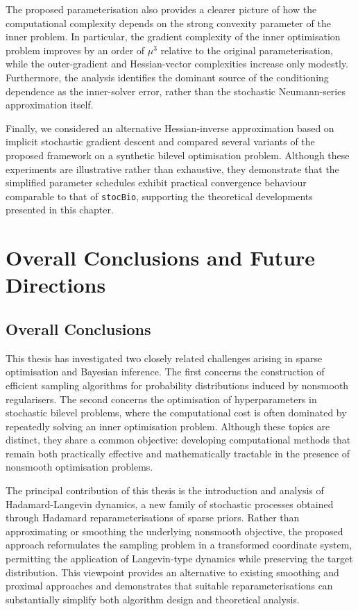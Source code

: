 \documentclass[11pt, twoside]{report}
\begin{document}
The proposed parameterisation also provides a clearer picture of how the computational complexity depends on the strong convexity parameter of the inner problem. In particular, the gradient complexity of the inner optimisation problem improves by an order of $\mu^3$ relative to the original parameterisation, while the outer-gradient and Hessian-vector complexities increase only modestly. Furthermore, the analysis identifies the dominant source of the conditioning dependence as the inner-solver error, rather than the stochastic Neumann-series approximation itself.

Finally, we considered an alternative Hessian-inverse approximation based on implicit stochastic gradient descent and compared several variants of the proposed framework on a synthetic bilevel optimisation problem. Although these experiments are illustrative rather than exhaustive, they demonstrate that the simplified parameter schedules exhibit practical convergence behaviour comparable to that of \texttt{stocBio}, supporting the theoretical developments presented in this chapter.

\chapter{Overall Conclusions and Future Directions}

\section{Overall Conclusions}

This thesis has investigated two closely related challenges arising in sparse optimisation and Bayesian inference. The first concerns the construction of efficient sampling algorithms for probability distributions induced by nonsmooth regularisers. The second concerns the optimisation of hyperparameters in stochastic bilevel problems, where the computational cost is often dominated by repeatedly solving an inner optimisation problem. Although these topics are distinct, they share a common objective: developing computational methods that remain both practically effective and mathematically tractable in the presence of nonsmooth optimisation problems.

The principal contribution of this thesis is the introduction and analysis of Hadamard-Langevin dynamics, a new family of stochastic processes obtained through Hadamard reparameterisations of sparse priors. Rather than approximating or smoothing the underlying nonsmooth objective, the proposed approach reformulates the sampling problem in a transformed coordinate system, permitting the application of Langevin-type dynamics while preserving the target distribution. This viewpoint provides an alternative to existing smoothing and proximal approaches and demonstrates that suitable reparameterisations can substantially simplify both algorithm design and theoretical analysis.
\end{document}
